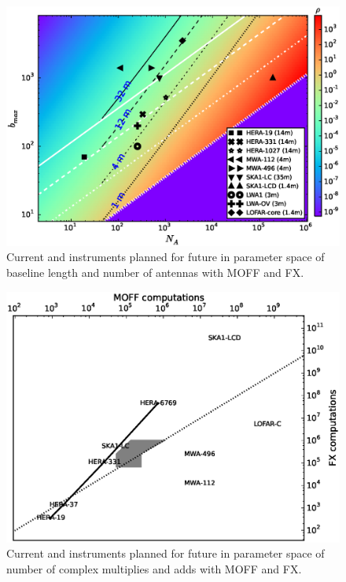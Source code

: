 \documentclass[a4paper,fleqn,usenatbib]{../mnras}
\begin{document}
\begin{figure}
  \includegraphics[width=\columnwidth]{MOFF_FX_crossover_baseline_n-antennas_rho_fov_gridding.eps}
  \caption{Current and instruments planned for future in parameter space of baseline length and number of antennas with MOFF and FX.}
  \label{fig:parameter-space-bll-nant-instruments}
\end{figure}

\begin{figure}
  \includegraphics[width=\columnwidth]{MOFF_FX_computations_fov_gridding_annotated.eps}
  \caption{Current and instruments planned for future in parameter space of number of complex multiplies and adds with MOFF and FX.}
  \label{fig:parameter-space-computations-instruments}
\end{figure}
\end{document}
